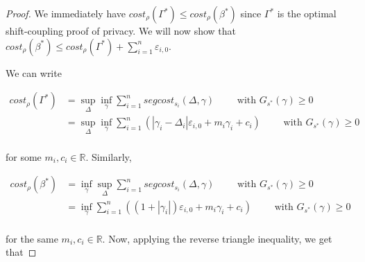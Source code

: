 \documentclass{article}
\newcommand{\R}{\mathbb{R}}
\renewcommand{\epsilon}{\varepsilon}
\newcommand{\1}{\langle 1 \rangle}
\newcommand{\2}{\langle 2 \rangle}
\begin{document}
\begin{proof}
    We immediately have $cost_\rho(\Gamma^*) \leq cost_\rho(\beta^*)$ since $\Gamma^*$ is the optimal shift-coupling proof of privacy. We will now show that $cost_\rho(\beta^*) \leq cost_\rho(\Gamma^*) + \sum_{i = 1}^n \epsilon_{i, 0}$.

    We can write 

    \begin{align*}
        cost_\rho(\Gamma^*) &= \sup_{\Delta} \inf_{\gamma} \sum_{i = 1}^n segcost_{s_i}(\Delta, \gamma) \qquad \text{ with } G_{s^*}(\gamma) \geq 0\\
        &= \sup_{\Delta} \inf_{\gamma} \sum_{i = 1}^n \left(|\gamma_i - \Delta_i| \epsilon_{i, 0} + m_i \gamma_i + c_i\right) \qquad \text{ with } G_{s^*}(\gamma) \geq 0\\
    \end{align*}

    for some $m_i, c_i \in \R$. Similarly, 

    \begin{align*}
        cost_\rho(\beta^*) &= \inf_{\gamma} \sup_{\Delta} \sum_{i = 1}^n segcost_{s_i}(\Delta, \gamma) \qquad \text{ with } G_{s^*}(\gamma) \geq 0\\
        &= \inf_{\gamma} \sum_{i = 1}^n \left((1 + |\gamma_i|) \epsilon_{i, 0} + m_i \gamma_i + c_i\right) \qquad \text{ with } G_{s^*}(\gamma) \geq 0\\
    \end{align*}

    for the same $m_i, c_i \in \R$. Now, applying the reverse triangle inequality, we get that


\end{proof}
\end{document}
